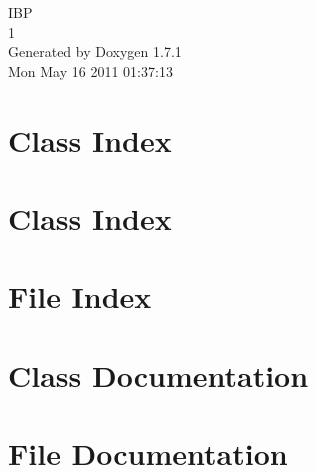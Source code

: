 \documentclass[a4paper]{book}
\begin{document}
\hypersetup{pageanchor=false}
\begin{titlepage}
\vspace*{7cm}
\begin{center}
{\Large IBP \\[1ex]\large 1 }\\
\vspace*{1cm}
{\large Generated by Doxygen 1.7.1}\\
\vspace*{0.5cm}
{\small Mon May 16 2011 01:37:13}\\
\end{center}
\end{titlepage}
\clearemptydoublepage
{}
\tableofcontents
\clearemptydoublepage
{}
\hypersetup{pageanchor=true}
\chapter{Class Index}

\chapter{Class Index}

\chapter{File Index}

\chapter{Class Documentation}








\chapter{File Documentation}














\printindex
\end{document}
